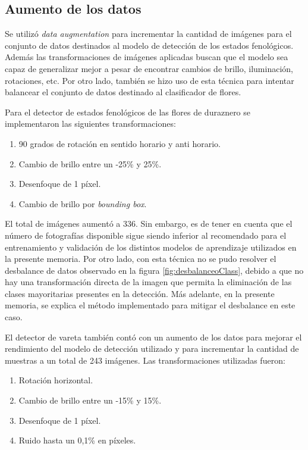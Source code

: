 \subsection{Aumento de los datos}
\label{aumentoDatos}
Se utilizó \textit{data augmentation} \cite{ARTICLE:20} para incrementar la cantidad de imágenes para el conjunto de datos destinados al modelo de detección de los estados fenológicos. Además las transformaciones de imágenes aplicadas buscan que el modelo sea capaz de generalizar mejor a pesar de encontrar cambios de brillo, iluminación, rotaciones, etc. Por otro lado, también se hizo uso de esta técnica para intentar balancear el conjunto de datos destinado al clasificador de flores.

Para el detector de estados fenológicos de las flores de duraznero se implementaron las siguientes transformaciones:

\begin{enumerate}
	\item 90 grados de rotación en sentido horario y anti horario.
	\item Cambio de brillo entre un -25\% y 25\%. 
	\item Desenfoque de 1 píxel.
	\item Cambio de brillo por \textit{bounding box}.
\end{enumerate}

El total de imágenes aumentó a 336. Sin embargo, es de tener en cuenta que el número de fotografías disponible sigue siendo inferior al recomendado para el entrenamiento y validación de los distintos modelos de aprendizaje utilizados en la presente memoria. Por otro lado, con esta técnica no se pudo resolver el desbalance de datos observado en la figura \ref{fig:desbalanceoClass}, debido a que no hay una transformación directa de la imagen que permita la eliminación de las clases mayoritarias presentes en la detección. Más adelante, en la presente memoria, se explica el método implementado para mitigar el desbalance en este caso.

El detector de vareta también contó con un aumento de los datos para mejorar el rendimiento del modelo de detección utilizado y para incrementar la cantidad de muestras a un total de 243 imágenes. Las transformaciones utilizadas fueron:

\begin{enumerate}
	\item Rotación horizontal.
	\item Cambio de brillo entre un -15\% y 15\%. 
	\item Desenfoque de 1 píxel.
	\item Ruido hasta un 0,1\% en píxeles.
\end{enumerate}

